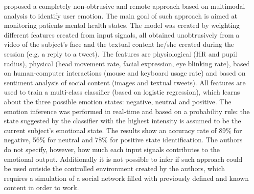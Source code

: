 \textcite{mental} proposed a completely non-obtrusive and remote approach based on multimodal analysis to identify user emotion. The main goal of such approach is aimed at monitoring patients mental health states. The model was created by weighting different features created from input signals, all obtained unobtrusively from a video of the subject's face and the textual content he/she created during the session (e.g. a reply to a tweet). The features are physiological (HR and pupil radius), physical (head movement rate, facial expression, eye blinking rate), based on human-computer interactions (mouse and keyboard usage rate) and based on sentiment analysis of social content (images and textual tweets). All features are used to train a multi-class classifier (based on logistic regression), which learns about the three possible emotion states: negative, neutral and positive. The emotion inference was performed in real-time and based on a probability rule: the state suggested by the classifier with the highest intensity is assumed to be the current subject's emotional state. The results show an accuracy rate of 89\% for negative, 56\% for neutral and 78\% for positive state identification. The authors do not specify, however, how much each input signals contributes to the emotional output. Additionally it is not possible to infer if such approach could be used outside the controlled environment created by the authors, which requires a simulation of a social network filled with previously defined and known content in order to work.

